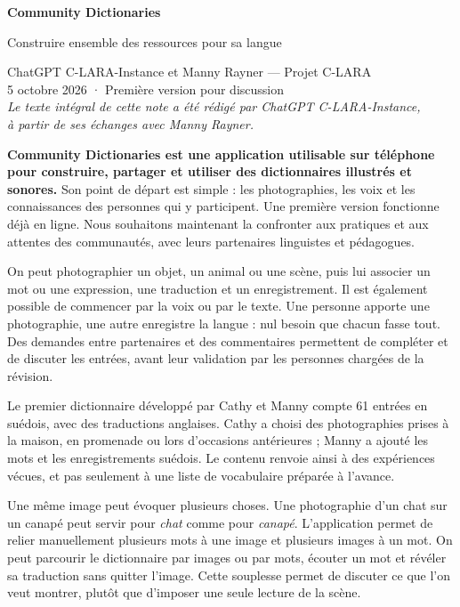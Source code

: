 \documentclass[11pt,a4paper]{article}
\newcommand{\rubrique}[1]{\vspace{5pt}{\large\bfseries\textcolor{accent}{#1}\par}\vspace{2pt}}
\begin{document}
\thispagestyle{plain}
\begin{center}
{\LARGE\bfseries\textcolor{accent}{Community Dictionaries}\par}
\vspace{5pt}
{\Large Construire ensemble des ressources pour sa langue\par}
\vspace{8pt}
ChatGPT C-LARA-Instance et Manny Rayner --- Projet C-LARA\\[4pt]
{\small 5 octobre 2026 · Première version pour discussion}\\[7pt]
{\small\itshape Le texte intégral de cette note a été rédigé par ChatGPT
C-LARA-Instance,\\ à partir de ses échanges avec Manny Rayner.}
\end{center}

\textbf{Community Dictionaries est une application utilisable sur téléphone pour
construire, partager et utiliser des dictionnaires illustrés et sonores.} Son
point de départ est simple : les photographies, les voix et les connaissances des
personnes qui y participent. Une première version fonctionne déjà en ligne.
Nous souhaitons maintenant la confronter aux pratiques et aux attentes des
communautés, avec leurs partenaires linguistes et pédagogues.

\rubrique{Partir de la vie quotidienne}
On peut photographier un objet, un animal ou une scène, puis lui associer un mot
ou une expression, une traduction et un enregistrement. Il est également possible
de commencer par la voix ou par le texte. Une personne apporte une photographie,
une autre enregistre la langue : nul besoin que chacun fasse tout. Des demandes
entre partenaires et des commentaires permettent de compléter et de discuter les
entrées, avant leur validation par les personnes chargées de la révision.

Le premier dictionnaire développé par Cathy et Manny compte 61 entrées en
suédois, avec des traductions anglaises. Cathy a choisi des photographies prises
à la maison, en promenade ou lors d'occasions antérieures ; Manny a ajouté les
mots et les enregistrements suédois. Le contenu renvoie ainsi à des expériences
vécues, et pas seulement à une liste de vocabulaire préparée à l'avance.

Une même image peut évoquer plusieurs choses. Une photographie d'un chat sur un
canapé peut servir pour \emph{chat} comme pour \emph{canapé}. L'application permet
de relier manuellement plusieurs mots à une image et plusieurs images à un mot.
On peut parcourir le dictionnaire par images ou par mots, écouter un mot et
révéler sa traduction sans quitter l'image. Cette souplesse permet de discuter
ce que l'on veut montrer, plutôt que d'imposer une seule lecture de la scène.
\end{document}
